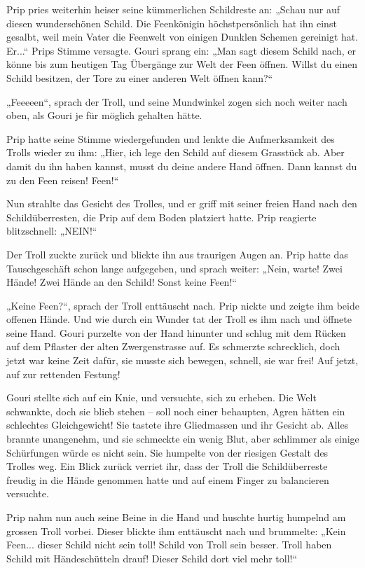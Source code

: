 \documentclass[10pt, a4paper, oneside]{book}
\begin{document}
Prip pries weiterhin heiser seine kümmerlichen Schildreste an: „Schau nur auf diesen wunderschönen Schild. Die Feenkönigin höchstpersönlich hat ihn einst gesalbt, weil mein Vater die Feenwelt von einigen Dunklen Schemen gereinigt hat. Er...“ Prips Stimme versagte. Gouri sprang ein: „Man sagt diesem Schild nach, er könne bis zum heutigen Tag Übergänge zur Welt der Feen öffnen. Willst du einen Schild besitzen, der Tore zu einer anderen Welt öffnen kann?“

„Feeeeen“, sprach der Troll, und seine Mundwinkel zogen sich noch weiter nach oben, als Gouri je für möglich gehalten hätte.

Prip hatte seine Stimme wiedergefunden und lenkte die Aufmerksamkeit des Trolls wieder zu ihm: „Hier, ich lege den Schild auf diesem Grasstück ab. Aber damit du ihn haben kannst, musst du deine andere Hand öffnen. Dann kannst du zu den Feen reisen! Feen!“

Nun strahlte das Gesicht des Trolles, und er griff mit seiner freien Hand nach den Schildüberresten, die Prip auf dem Boden platziert hatte. Prip reagierte blitzschnell: „NEIN!“

Der Troll zuckte zurück und blickte ihn aus traurigen Augen an. Prip hatte das Tauschgeschäft schon lange aufgegeben, und sprach weiter: „Nein, warte! Zwei Hände! Zwei Hände an den Schild! Sonst keine Feen!“

„Keine Feen?“, sprach der Troll enttäuscht nach. Prip nickte und zeigte ihm beide offenen Hände. Und wie durch ein Wunder tat der Troll es ihm nach und öffnete seine Hand. Gouri purzelte von der Hand hinunter und schlug mit dem Rücken auf dem Pflaster der alten Zwergenstrasse auf. Es schmerzte schrecklich, doch jetzt war keine Zeit dafür, sie musste sich bewegen, schnell, sie war frei! Auf jetzt, auf zur rettenden Festung!

Gouri stellte sich auf ein Knie, und versuchte, sich zu erheben. Die Welt schwankte, doch sie blieb stehen – soll noch einer behaupten, Agren hätten ein schlechtes Gleichgewicht! Sie tastete ihre Gliedmassen und ihr Gesicht ab. Alles brannte unangenehm, und sie schmeckte ein wenig Blut, aber schlimmer als einige Schürfungen würde es nicht sein. Sie humpelte von der riesigen Gestalt des Trolles weg. Ein Blick zurück verriet ihr, dass der Troll die Schildüberreste freudig in die Hände genommen hatte und auf einem Finger zu balancieren versuchte.

Prip nahm nun auch seine Beine in die Hand und huschte hurtig humpelnd am grossen Troll vorbei. Dieser blickte ihm enttäuscht nach und brummelte: „Kein Feen... dieser Schild nicht sein toll! Schild von Troll sein besser. Troll haben Schild mit Händeschütteln drauf! Dieser Schild dort viel mehr toll!“
\end{document}
